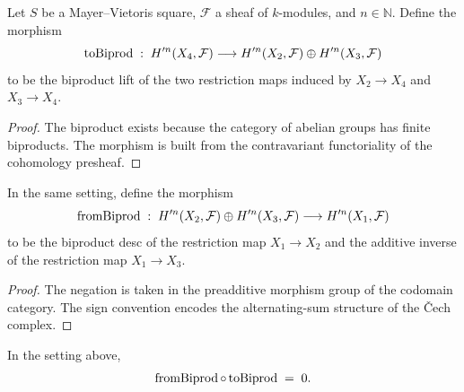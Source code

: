 \begin{definition}\label{mk-def:Scheme_HModule_prime_toBiprod}
  \leanok


  Let \(S\) be a Mayer--Vietoris square, \(\mathcal F\) a sheaf of \(k\)-modules, and \(n \in \mathbb N\). Define the morphism
  \[
    \operatorname{toBiprod} \;:\; H^{\prime n}(X_4, \mathcal F) \longrightarrow H^{\prime n}(X_2, \mathcal F) \oplus H^{\prime n}(X_3, \mathcal F)
  \]
  to be the biproduct lift of the two restriction maps induced by \(X_2 \to X_4\) and \(X_3 \to X_4\).
\end{definition}

\begin{proof}
  \leanok

  The biproduct exists because the category of abelian groups has finite biproducts. The morphism is built from the contravariant functoriality of the cohomology presheaf.
\end{proof}

\begin{definition}\label{mk-def:Scheme_HModule_prime_fromBiprod}
  \leanok


  In the same setting, define the morphism
  \[
    \operatorname{fromBiprod} \;:\; H^{\prime n}(X_2, \mathcal F) \oplus H^{\prime n}(X_3, \mathcal F) \longrightarrow H^{\prime n}(X_1, \mathcal F)
  \]
  to be the biproduct desc of the restriction map \(X_1 \to X_2\) and the additive inverse of the restriction map \(X_1 \to X_3\).
\end{definition}

\begin{proof}
  \leanok

  The negation is taken in the preadditive morphism group of the codomain category. The sign convention encodes the alternating-sum structure of the \v{C}ech complex.
\end{proof}

\begin{lemma}\label{mk-lem:Scheme_HModule_prime_toBiprod_fromBiprod}
  \leanok


  In the setting above,
  \[
    \operatorname{fromBiprod} \circ \operatorname{toBiprod} \;=\; 0.
  \]
\end{lemma}

